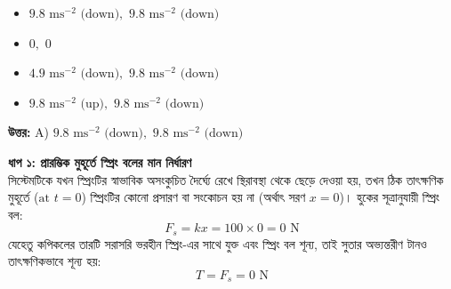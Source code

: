 \documentclass[12pt, a4paper]{article}
\begin{document}
{%
\vspace{1em}
\begin{center}
\end{center}
\vspace{1em}

\begin{itemize}[label={}, leftmargin=1cm, itemsep=0.5em]
\item[\textbf{A)}] $9.8\text{ ms}^{-2} \text{ (down)}, \,\, 9.8\text{ ms}^{-2} \text{ (down)}$
\item[\textbf{B)}] $0, \,\, 0$
\item[\textbf{C)}] $4.9\text{ ms}^{-2} \text{ (down)}, \,\, 9.8\text{ ms}^{-2} \text{ (down)}$
\item[\textbf{D)}] $9.8\text{ ms}^{-2} \text{ (up)}, \,\, 9.8\text{ ms}^{-2} \text{ (down)}$
\end{itemize}

\vspace{0.5em}
\begin{tcolorbox}[answerbox]
\textbf{\color{success} উত্তর:} A) $9.8\text{ ms}^{-2} \text{ (down)}, \,\, 9.8\text{ ms}^{-2} \text{ (down)}$
\end{tcolorbox}
\vspace{1em}

\begin{tcolorbox}[solutionbox={সমাধান (Solution)}]
\noindent
\textbf{ধাপ ১: প্রারম্ভিক মুহূর্তে স্প্রিং বলের মান নির্ধারণ} \\
সিস্টেমটিকে যখন স্প্রিংটির স্বাভাবিক অসংকুচিত দৈর্ঘ্যে রেখে স্থিরাবস্থা থেকে ছেড়ে দেওয়া হয়, তখন ঠিক তাৎক্ষণিক মুহূর্তে ($\text{at } t = 0$) স্প্রিংটির কোনো প্রসারণ বা সংকোচন হয় না (অর্থাৎ সরণ $x = 0$)। হুকের সূত্রানুযায়ী স্প্রিং বল:
\[ F_s = k x = 100 \times 0 = 0\text{ N} \]
যেহেতু কপিকলের তারটি সরাসরি ভরহীন স্প্রিং-এর সাথে যুক্ত এবং স্প্রিং বল শূন্য, তাই সুতার অভ্যন্তরীণ টানও তাৎক্ষণিকভাবে শূন্য হয়:
\[ T = F_s = 0\text{ N} \]


\end{tcolorbox}}
\end{document}
